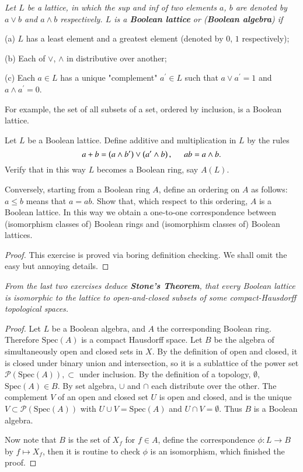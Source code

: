 \begin{problem}\em
Let $L$ be a lattice, in which the sup and inf of two elements $a$, $b$ are denoted by $a\vee b$ and $a\wedge b$ respectively. $L$ is a \textbf{Boolean lattice} or (\textbf{Boolean algebra}) if \par
(a) $L$ has a least element and a greatest element (denoted by $0$, $1$ respectively);\par
(b) Each of $\vee$, $\wedge$ in distributive over another;\par
(c) Each $a\in L$ has a unique "complement" $a^\prime\in L$ such that $a\vee a^\prime=1$ and $a\wedge a^\prime=0$.\par
For example, the set of all subsets of a set, ordered by inclusion, is a Boolean lattice.\par
Let $L$ be a Boolean lattice. Define additive and multiplication in $L$ by the rules 
$$
a+b=\left( a\land b^{\prime} \right) \lor \left( a^{\prime}\land b \right) ,\hspace{0.5cm}ab=a\land b.
$$
Verify that in this way $L$ becomes a Boolean ring, say $A(L)$.\par
Conversely, starting from a Boolean ring $A$, define an ordering on $A$ as follows: $a\le b$ means that $a=ab$. Show that, which respect to this ordering, $A$ is a Boolean lattice. In this way we obtain a one-to-one correspondence between (isomorphism classes of) Boolean rings and (isomorphism classes of) Boolean lattices.
\end{problem}
\begin{proof}
This exercise is proved via boring definition checking. We shall omit the easy but annoying details.
\end{proof}
\begin{problem}\em
From the last two exercises deduce \textbf{Stone's Theorem}, that every Boolean lattice is isomorphic to the lattice to open-and-closed subsets of some compact-Hausdorff topological spaces.
\end{problem}
\begin{proof}
Let $L$ be a Boolean algebra, and $A$ the corresponding Boolean ring. Therefore $\mathrm{Spec}(A)$ is a compact Hausdorff space. Let $B$ be the algebra of simultaneously open and closed sets in $X$. By the definition of open and closed, it is closed under binary union and intersection, so it is a sublattice of the power set $\mathcal{P}(\mathrm{Spec}(A)),\subset$ under inclusion. By the definition of a topology, $\emptyset$, $\mathrm{Spec}(A)\in B$. By set algebra, $\cup$ and $\cap$ each distribute over the other. The complement $V$ of an open and closed set $U$ is open and closed, and is the unique $V\subset\mathcal{P}(\mathrm{Spec}(A))$ with $U\cup V=\mathrm{Spec}(A)$ and $U\cap V=\emptyset$. Thus $B$ is a Boolean algebra.\par
Now note that $B$ is the set of $X_f$ for $f\in A$, define the correspondence $\phi:L\to B$ by $f\mapsto X_f$, then it is routine to check $\phi$ is an isomorphism, which finished the proof.
\end{proof}
